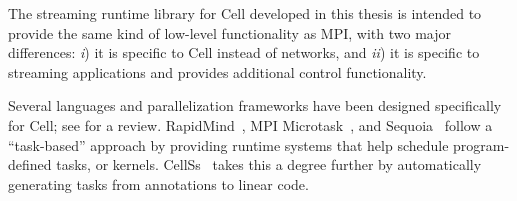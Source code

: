 The streaming runtime library for Cell developed in this thesis is intended to provide the same kind of low-level functionality as MPI, with two major differences: \emph{i}) it is specific to Cell instead of networks, and \emph{ii}) it is specific to streaming applications and provides additional control functionality.

Several languages and parallelization frameworks have been designed specifically for Cell; see \cite{cell:pf} for a review. RapidMind~\cite{rapidmind}, MPI Microtask~\cite{mpimicrotask}, and Sequoia~\cite{sequoia} follow a ``task-based'' approach by providing runtime systems that help schedule program-defined tasks, or kernels. CellSs~\cite{cellss} takes this a degree further by automatically generating tasks from annotations to linear code.
